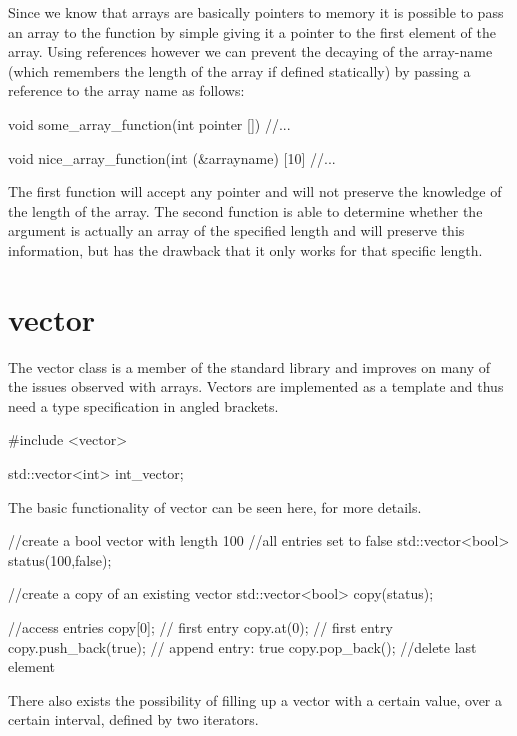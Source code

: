 \documentclass[10pt,a4paper]{scrartcl}
\begin{document}
\begin{multicols*}{2}
Since we know that arrays are basically pointers to memory it is possible to pass an array to the function by simple giving it a pointer to the first element of the array. Using references however we can prevent the decaying of the array-name (which remembers the length of the array if defined statically) by passing a reference to the array name as follows:

\begin{TPCpp}
void some_array_function(int pointer []){
	//...
}

void nice_array_function(int (&arrayname) [10]{
	//...
}
\end{TPCpp}

The first function will accept any pointer and will not preserve the knowledge of the length of the array. The second function is able to determine whether the argument is actually an array of the specified length and will preserve this information, but has the drawback that it only works for that specific length.

\section{vector}
\label{sec:vector}

The vector class is a member of the standard library and improves on many of the issues observed with arrays. Vectors are implemented as a template and thus need a type specification in angled brackets.

\begin{TPCpp}
#include <vector>

std::vector<int> int_vector;
\end{TPCpp}

The basic functionality of vector can be seen here,  for more details.

\begin{TPCpp}
//create a bool vector with length 100
//all entries set to false
std::vector<bool> status(100,false);

//create a copy of an existing vector
std::vector<bool> copy(status);

//access entries
copy[0]; // first entry
copy.at(0); // first entry
copy.push_back(true); // append entry: true
copy.pop_back(); //delete last element
\end{TPCpp}

There also exists the possibility of filling up a vector with a certain value, over a certain interval, defined by two iterators.


\end{multicols*}
\end{document}

